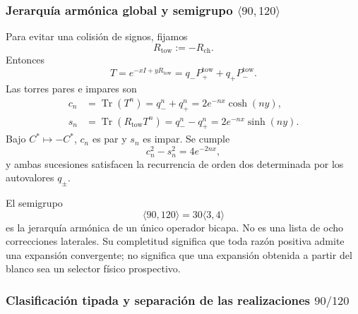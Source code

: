 \subsubsection{Jerarquía armónica global y semigrupo \(\langle90,120\rangle\)}

Para evitar una colisión de signos, fijamos
\[
R_{\mathrm{tow}}:=-R_{\mathrm{ch}}.
\]
Entonces
\begin{equation}
T=e^{-xI+yR_{\mathrm{tow}}}
=q_-P_+^{\mathrm{tow}}+q_+P_-^{\mathrm{tow}}.
\label{eq:tower-operator}
\end{equation}
Las torres pares e impares son
\begin{align}
c_n&=\operatorname{Tr}(T^n)
=q_-^n+q_+^n
=2e^{-nx}\cosh(ny),
\label{eq:cn}\\
s_n&=\operatorname{Tr}(R_{\mathrm{tow}}T^n)
=q_-^n-q_+^n
=2e^{-nx}\sinh(ny).
\label{eq:sn}
\end{align}
Bajo \(C^*\mapsto-C^*\), \(c_n\) es par y \(s_n\) es impar. Se cumple
\begin{equation}
c_n^2-s_n^2=4e^{-2nx},
\label{eq:tower-invariant}
\end{equation}
y ambas sucesiones satisfacen la recurrencia de orden dos determinada por los
autovalores \(q_\pm\).

El semigrupo
\begin{equation}
\langle90,120\rangle=30\langle3,4\rangle
\label{eq:semigroup}
\end{equation}
es la jerarquía armónica de un único operador bicapa. No es una lista de ocho
correcciones laterales. Su completitud significa que toda razón positiva
admite una expansión convergente; no significa que una expansión obtenida a
partir del blanco sea un selector físico prospectivo.

\subsubsection{Clasificación tipada y separación de las realizaciones \(90/120\)}

